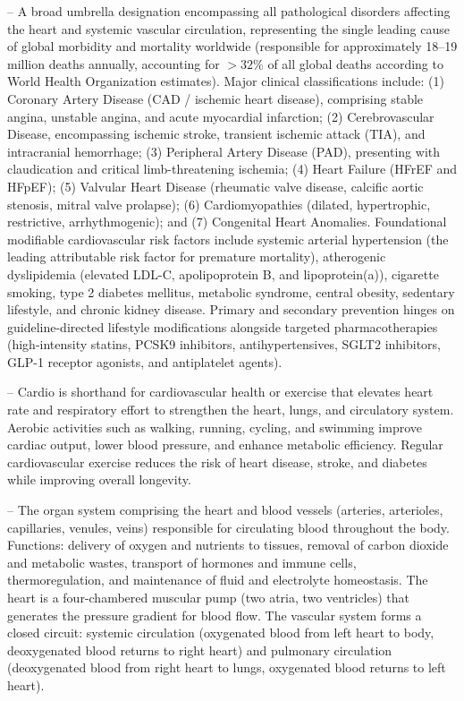 -- A broad umbrella designation encompassing all pathological disorders affecting the heart and systemic vascular circulation, representing the single leading cause of global morbidity and mortality worldwide (responsible for approximately 18--19 million deaths annually, accounting for $>32\%$ of all global deaths according to World Health Organization estimates). Major clinical classifications include: (1) Coronary Artery Disease (CAD / ischemic heart disease), comprising stable angina, unstable angina, and acute myocardial infarction; (2) Cerebrovascular Disease, encompassing ischemic stroke, transient ischemic attack (TIA), and intracranial hemorrhage; (3) Peripheral Artery Disease (PAD), presenting with claudication and critical limb-threatening ischemia; (4) Heart Failure (HFrEF and HFpEF); (5) Valvular Heart Disease (rheumatic valve disease, calcific aortic stenosis, mitral valve prolapse); (6) Cardiomyopathies (dilated, hypertrophic, restrictive, arrhythmogenic); and (7) Congenital Heart Anomalies. Foundational modifiable cardiovascular risk factors include systemic arterial hypertension (the leading attributable risk factor for premature mortality), atherogenic dyslipidemia (elevated LDL-C, apolipoprotein B, and lipoprotein(a)), cigarette smoking, type 2 diabetes mellitus, metabolic syndrome, central obesity, sedentary lifestyle, and chronic kidney disease. Primary and secondary prevention hinges on guideline-directed lifestyle modifications alongside targeted pharmacotherapies (high-intensity statins, PCSK9 inhibitors, antihypertensives, SGLT2 inhibitors, GLP-1 receptor agonists, and antiplatelet agents).

-- Cardio is shorthand for cardiovascular health or exercise that elevates heart rate and respiratory effort to strengthen the heart, lungs, and circulatory system. Aerobic activities such as walking, running, cycling, and swimming improve cardiac output, lower blood pressure, and enhance metabolic efficiency. Regular cardiovascular exercise reduces the risk of heart disease, stroke, and diabetes while improving overall longevity.

-- The organ system comprising the heart and blood vessels (arteries, arterioles, capillaries, venules, veins) responsible for circulating blood throughout the body. Functions: delivery of oxygen and nutrients to tissues, removal of carbon dioxide and metabolic wastes, transport of hormones and immune cells, thermoregulation, and maintenance of fluid and electrolyte homeostasis. The heart is a four-chambered muscular pump (two atria, two ventricles) that generates the pressure gradient for blood flow. The vascular system forms a closed circuit: systemic circulation (oxygenated blood from left heart to body, deoxygenated blood returns to right heart) and pulmonary circulation (deoxygenated blood from right heart to lungs, oxygenated blood returns to left heart).


